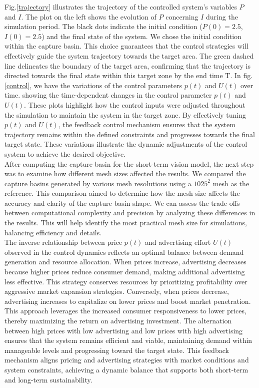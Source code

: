\documentclass[]{interact}
\theoremstyle{plain}%
\theoremstyle{definition}
\theoremstyle{remark}
\begin{document}
Fig.\ref{trajectory} illustrates the trajectory of the controlled system's variables \( P \) and \( I \). The plot on the left shows the evolution of \( P \) concerning \( I \) during the simulation period. The black dots indicate the initial condition (\( P(0) = 2.5 \), \( I(0) = 2.5 \)) and the final state of the system. We chose the initial condition within the capture basin. This choice guarantees that the control strategies will effectively guide the system trajectory towards the target area. The green dashed line delineates the boundary of the target area, confirming that the trajectory is directed towards the final state within this target zone by the end time T.
In fig.\ref{control}, we have the variations of the control parameters \( p(t) \) and \( U(t) \) over time. showing the time-dependent changes in the control parameter \( p(t) \) and  \( U(t) \). These plots highlight how the control inputs were adjusted throughout the simulation to maintain the system in the target zone. By effectively tuning \( p(t) \) and \( U(t) \), the feedback control mechanism ensures that the system trajectory remains within the defined constraints and progresses towards the final target state. These variations illustrate the dynamic adjustments of the control system to achieve the desired objective.\\
After computing the capture basin for the short-term vision model, the next step was to examine how different mesh sizes affected the results. We compared the capture basins generated by various mesh resolutions using a \(1025^2\) mesh as the reference.
This comparison aimed to determine how the mesh size affects the accuracy and clarity of the capture basin shape. We can assess the trade-offs between computational complexity and precision by analyzing these differences in the results. This will help identify the most practical mesh size for simulations, balancing efficiency and details.\\
The inverse relationship between price \(p(t)\) and advertising effort \(U(t)\) observed in the control dynamics reflects an optimal balance between demand generation and resource allocation. When prices increase, advertising decreases because higher prices reduce consumer demand, making additional advertising less effective. This strategy conserves resources by prioritizing profitability over aggressive market expansion strategies. Conversely, when prices decrease, advertising increases to capitalize on lower prices and boost market penetration. This approach leverages the increased consumer responsiveness to lower prices, thereby maximizing the return on advertising investment. The alternation between high prices with low advertising and low prices with high advertising ensures that the system remains efficient and viable, maintaining demand within manageable levels and progressing toward the target state. This feedback mechanism aligns pricing and advertising strategies with market conditions and system constraints, achieving a dynamic balance that supports both short-term and long-term sustainability.
\end{document}
